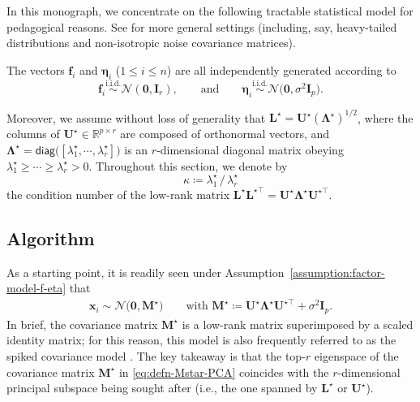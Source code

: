 In this monograph, we concentrate on the following tractable statistical model for pedagogical reasons.
See  \citet[Chapter 10]{fan2020statistical} for more general settings (including, say, heavy-tailed distributions and non-isotropic noise covariance matrices).
%
\begin{assumption}
\label{assumption:factor-model-f-eta}
The vectors $\bm{f}_{i}$ and $\bm{\eta}_{i}$ ($1\leq i\leq n$) are all independently generated according to
%
\begin{equation}
	\bm{f}_{i}\overset{\mathrm{i.i.d.}}{\sim}\mathcal{N}(\bm{0},\bm{I}_{r}),
	\qquad \text{and} \qquad
	\bm{\eta}_{i}\overset{\mathrm{i.i.d.}}{\sim}\mathcal{N} \big( \bm{0}, \sigma^2\bm{I}_{p} \big).
	\label{eq:random-model-fi-eta-i}
\end{equation}
%
\end{assumption}
%
Moreover, we assume without loss of generality that $\bm{L}^{\star}=\bm{U}^{\star} (\bm{\Lambda}^{\star})^{1/2}$, where the columns of $\bm{U}^{\star}\in \mathbb{R}^{p\times r}$ are composed of orthonormal vectors, and $\bm{\Lambda}^{\star}=\mathsf{diag}\big( [\lambda_1^{\star}, \cdots, \lambda_r^{\star}] \big)$ is an $r$-dimensional diagonal matrix obeying $\lambda_1^{\star}\geq \cdots \geq \lambda_r^{\star}>0$.
Throughout this section, we denote by $$\kappa \coloneqq \lambda_1^{\star}\,/\,\lambda_r^{\star}$$ the condition number of the low-rank matrix $\bm{L}^{\star}\bm{L}^{\star\top}= \bm{U}^{\star}\bm{\Lambda}^{\star}\bm{U}^{\star\top}$.



\subsection{Algorithm}
\label{sec:algorithm-PCA}

As a starting point, it is readily seen under Assumption~\ref{assumption:factor-model-f-eta} that
%
\begin{align}
	\bm{x}_{i}\sim\mathcal{N}\big(\bm{0},\bm{M}^{\star}\big)
	\quad\quad
	\text{with }\bm{M}^{\star} \coloneqq \bm{U}^{\star}\bm{\Lambda}^{\star}\bm{U}^{\star\top} + \sigma^2 \bm{I}_p.
	\label{eq:defn-Mstar-PCA}
\end{align}
%
In brief, the covariance matrix $\bm{M}^{\star}$  is a low-rank matrix superimposed by a scaled identity matrix;
for this reason, this model is also frequently referred to as the spiked covariance model \citep{johnstone2001distribution}.
The key takeaway is that  the top-$r$ eigenspace of the covariance matrix $\bm{M}^{\star}$ in \eqref{eq:defn-Mstar-PCA} coincides with the $r$-dimensional principal subspace being sought after (i.e., the one spanned by $\bm{L}^{\star}$ or $\bm{U}^{\star}$).



